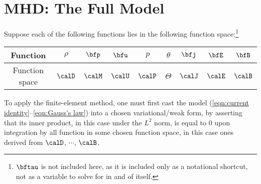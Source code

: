 \section{MHD: The Full Model}

    Suppose each of the following functions lies in the following function space:\footnote{$\bftau$ is not included here, as it is included only as a notational shortcut, not as a variable to solve for in and of itself.} 
    \begin{center}\begin{tabular}{ c || c : c c : c c | c | c c }
        Function  &  $\rho$  &  $\bfp$  &  $\bfu$  &  $p$  &  $\theta$ 
         &  $\bfj$  &  $\bfE$  &  $\bfB$  \\
        \hline
        Function space  &  $\calD$  &  $\calM$  &  $\calU$  &  $\calP$  &  $\Theta$  &  $\calJ$  &  $\calE$  &  $\calB$  \\
    \end{tabular}\end{center}
    
    To apply the finite-element method, one must first cast the model (\ref{eqn:current identity}--\ref{eqn:Gauss's law}) into a chosen variational/weak form, by asserting that its inner product, in this case under the $L^{2}$ norm, is equal to $0$ upon integration by all function in some chosen function space, in this case ones derived from $\calD$, $\cdots$, $\calB$.


    
    
    
